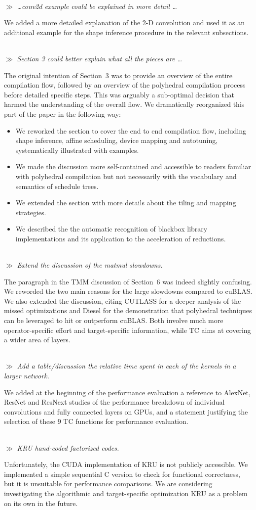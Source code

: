 \documentclass[letterpaper,11pt]{article}
\newcommand{\rev}[1]{~\\[0.5cm]{\tiny $\gg$} {\it #1}}
\newcommand{\cont}{\textlangle{}\dots\textrangle{}}
\begin{document}

\rev{\cont conv2d example could be explained in more detail \cont}

We added a more detailed explanation of the 2-D convolution and used it as an
additional example for the shape inference procedure in the relevant
subsections.

\rev{Section 3 could better explain what all the pieces are \cont}

The original intention of Section~3 was to provide an overview of the
entire compilation flow, followed by an overview of the polyhedral
compilation process before detailed specific steps.  This was arguably
a sub-optimal decision that harmed the understanding of the overall
flow. We dramatically reorganized this part of the paper in the following way:
\begin{itemize}
\item We reworked the section to cover the end to end compilation
  flow, including shape inference, affine scheduling, device mapping
  and autotuning, systematically illustrated with examples.
\item We made the discussion more self-contained and accessible to
  readers familiar with polyhedral compilation but not necessarily
  with the vocabulary and semantics of schedule trees.
\item We extended the section with more
  details about the tiling and mapping strategies.
\item We described the the automatic recognition of blackbox library
  implementations and its application to the acceleration of
  reductions.
\end{itemize}


\rev{Extend the discussion of the matmul slowdowns.}

The paragraph in the TMM discussion of Section~6 was indeed slightly
confusing. We reworded the two main reasons for the large slowdowns
compared to cuBLAS. We also extended the discussion, citing CUTLASS
for a deeper analysis of the missed optimizations and Diesel for the
demonstration that polyhedral techniques can be leveraged to hit or
outperform cuBLAS. Both involve much more operator-specific effort and
target-specific information, while TC aims at covering a wider area of
layers.

\rev{Add a table/discussion the relative time spent in each of the kernels in a
larger network.}

We added at the beginning of the performance evaluation a reference to
AlexNet, ResNet and ResNext studies of the performance breakdown of
individual convolutions and fully connected layers on GPUs, and a
statement justifying the selection of these 9 TC functions for
performance evaluation.

\rev{KRU hand-coded factorized codes.}

Unfortunately, the CUDA implementation of KRU is not publicly
accessible.  We implemented a simple sequential C version to check for
functional correctness, but it is unsuitable for performance
comparisons. We are considering investigating the algorithmic and
target-specific optimization KRU as a problem on its own in the
future.
\end{document}
